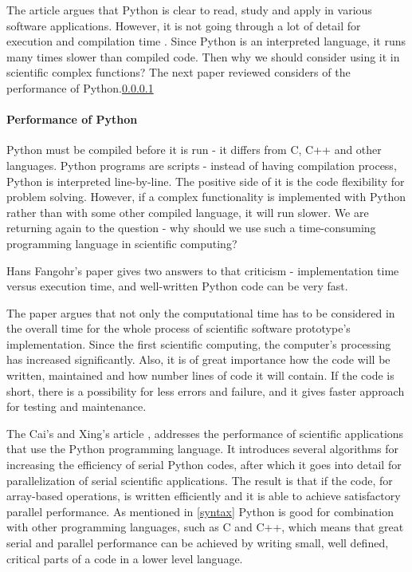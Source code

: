 The article argues that Python is clear to read, study and apply in various software applications. However, it is not going through a lot of detail for execution and compilation time \cite{HansPython}. Since Python is an interpreted language, it runs many times slower than compiled code. Then why we should consider using it in scientific complex functions? The next paper reviewed considers of the performance of Python.\ref{performance}

\paragraph{Performance of Python}
\label{performance}

Python must be compiled before it is run - it differs from C, C++ and other languages. Python programs are scripts - instead of having compilation process, Python is interpreted line-by-line. The positive side of it is the code flexibility for problem solving. However, if a complex functionality is implemented with Python rather than with some other compiled language, it will run slower. We are returning again to the question - why should we use such a time-consuming programming language in scientific computing? \cite{ScottPython}

 Hans Fangohr's paper \cite{HansPython} gives two answers to that criticism - implementation time versus execution time, and well-written Python code can be very fast.

The paper argues that not only the computational time has to be considered in the overall time for the whole process of scientific software prototype's implementation. Since the first scientific computing, the computer's processing has increased significantly. Also, it is of great importance how the code will be written, maintained and how number lines of code it will contain. If the code is short, there is a possibility for less errors and failure, and it gives faster approach for testing and maintenance. 

The Cai's and Xing's article \cite{cai2005performance}, addresses the performance of scientific applications that use the Python programming language. It introduces several algorithms for increasing the efficiency of serial Python codes, after which it goes into detail for parallelization of serial scientific applications. The result is that if the code, for array-based operations, is written efficiently and it is able to achieve satisfactory parallel performance. As mentioned in \ref{syntax} Python is good for combination with other programming languages, such as C and C++, which means that great serial and parallel performance can be achieved by writing small, well defined, critical parts of a code in a lower level language. 

